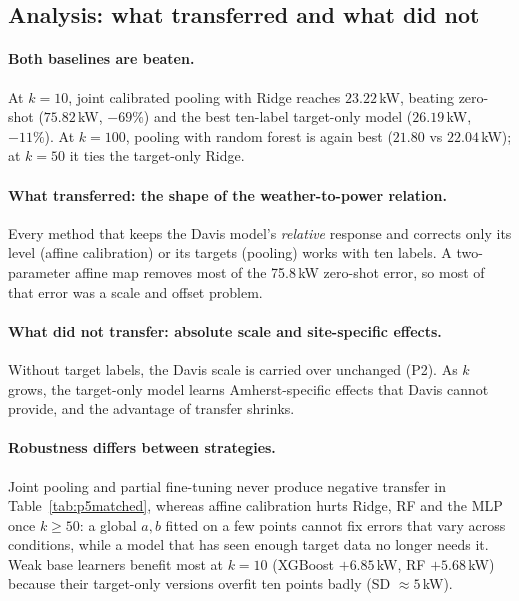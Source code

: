 \documentclass[11pt,letterpaper]{article}
\begin{document}
\subsection{Analysis: what transferred and what did not}
\paragraph{Both baselines are beaten.} At $k=10$, joint calibrated pooling with Ridge reaches
$23.22$\,kW, beating zero-shot ($75.82$\,kW, $-69\%$) and the best ten-label target-only model
($26.19$\,kW, $-11\%$). At $k=100$, pooling with random forest is again best ($21.80$ vs
$22.04$\,kW); at $k=50$ it ties the target-only Ridge.

\paragraph{What transferred: the shape of the weather-to-power relation.} Every method that keeps the
Davis model's \emph{relative} response and corrects only its level (affine calibration) or its
targets (pooling) works with ten labels. A two-parameter affine map removes most of the 75.8\,kW
zero-shot error, so most of that error was a scale and offset problem.

\paragraph{What did not transfer: absolute scale and site-specific effects.} Without target labels,
the Davis scale is carried over unchanged (P2). As $k$ grows, the target-only model learns
Amherst-specific effects that Davis cannot provide, and the advantage of transfer shrinks.

\paragraph{Robustness differs between strategies.} Joint pooling and partial fine-tuning never
produce negative transfer in Table~\ref{tab:p5matched}, whereas affine calibration hurts Ridge, RF
and the MLP once $k\ge50$: a global $a,b$ fitted on a few points cannot fix errors that vary across
conditions, while a model that has seen enough target data no longer needs it. Weak base learners
benefit most at $k=10$ (XGBoost $+6.85$\,kW, RF $+5.68$\,kW) because their target-only versions
overfit ten points badly (SD $\approx5$\,kW).
\FloatBarrier

\end{document}
